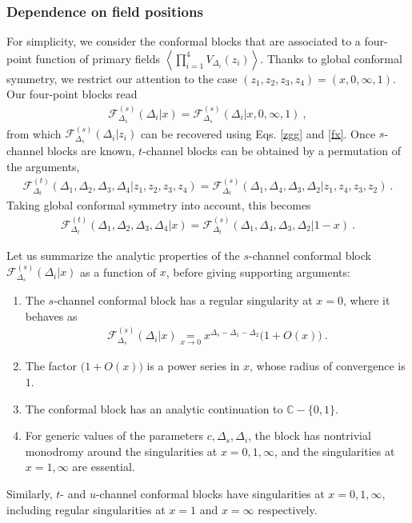 \documentclass[12pt, a4paper, notitlepage, twoside]{report}
\numberwithin{equation}{section}
\theoremstyle{break}
\begin{document}
\subsubsection{Dependence on field positions}

For simplicity, we consider the conformal blocks that are associated to a four-point function of primary fields $\left<\prod_{i=1}^4V_{\Delta_i}(z_i)\right>$. 
Thanks to global conformal symmetry, we restrict our attention to the case $(z_1,z_2,z_3,z_4)=(x,0,\infty, 1)$. Our four-point blocks read
\begin{align}
 \mathcal{F}^{(s)}_{\Delta_s}(\Delta_i|x)=\mathcal{F}^{(s)}_{\Delta_s}(\Delta_i|x,0,\infty,1)\ ,
\end{align}
from which $\mathcal{F}^{(s)}_{\Delta_s}(\Delta_i|z_i)$ can be recovered  using Eqs. \eqref{zgg} and \eqref{fx}.
Once $s$-channel blocks are known, $t$-channel blocks can be obtained by a permutation of the arguments, 
\begin{align}
 \mathcal{F}^{(t)}_{\Delta_t}(\Delta_1,\Delta_2,\Delta_3,\Delta_4|z_1,z_2,z_3,z_4) = \mathcal{F}^{(s)}_{\Delta_t}(\Delta_1,\Delta_4,\Delta_3,\Delta_2|z_1,z_4,z_3,z_2)\ . 
\label{gtgs}
\end{align}
Taking global conformal symmetry into account, this becomes
\begin{align}
 \mathcal{F}^{(t)}_{\Delta_t}(\Delta_1,\Delta_2,\Delta_3,\Delta_4|x) = \mathcal{F}^{(s)}_{\Delta_t}(\Delta_1,\Delta_4,\Delta_3,\Delta_2|1-x)\ .
\end{align}

Let us summarize the analytic properties of 
the $s$-channel conformal block $\mathcal{F}^{(s)}_{\Delta_s}(\Delta_i|x)$ as a function of $x$, before giving supporting arguments:
\begin{enumerate}
 \item The $s$-channel conformal block has a regular singularity at $x=0$, where it behaves as 
 \begin{align}
 \mathcal{F}^{(s)}_{\Delta_s}(\Delta_i|x) \underset{x\to 0}{=} x^{\Delta_s-\Delta_1-\Delta_2}\Big( 1+ O(x)\Big)\ .
\end{align}
\item The factor $\big( 1+ O(x)\big)$ is a power series in $x$, whose radius of convergence is $1$.
\item The conformal block has an analytic continuation to $\mathbb{C}-\{0,1\}$. 
\item For generic values of the parameters $c,\Delta_s,\Delta_i$, the block has nontrivial monodromy around the singularities at $x=0,1,\infty$, and the singularities at $x=1,\infty$ are essential.
\end{enumerate}
Similarly, $t$- and $u$-channel conformal blocks have singularities at $x=0,1,\infty$, including 
regular singularities at $x=1$ and $x=\infty$ respectively.
\end{document}
